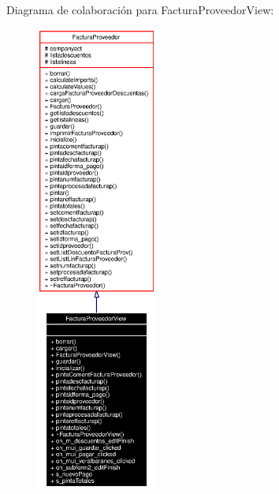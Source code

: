 Diagrama de colaboraci\'{o}n para Factura\-Proveedor\-View:\begin{figure}[H]
\begin{center}
\leavevmode
\includegraphics[width=112pt]{classFacturaProveedorView__coll__graph}
\end{center}
\end{figure}
